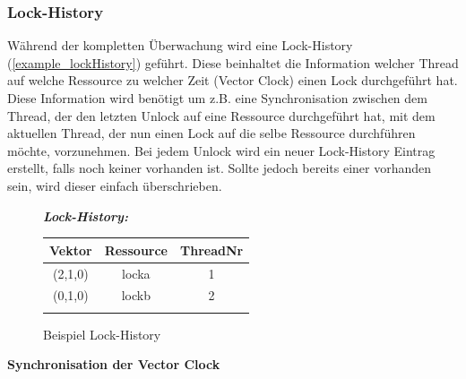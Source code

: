 \documentclass[10pt,a4paper]{article}
\begin{document}
\subsubsection{Lock-History}\label{lock_history}
\begin{flushleft}
Während der kompletten Überwachung wird eine Lock-History (\autoref{example_lockHistory}) geführt. Diese beinhaltet die Information welcher Thread auf welche Ressource zu welcher Zeit (Vector Clock) einen Lock durchgeführt hat. Diese Information wird benötigt um z.B. eine Synchronisation zwischen dem Thread, der den letzten Unlock auf eine Ressource durchgeführt hat, mit dem aktuellen Thread, der nun einen Lock auf die selbe Ressource durchführen möchte, vorzunehmen. Bei jedem Unlock wird ein neuer Lock-History Eintrag erstellt, falls noch keiner vorhanden ist. Sollte jedoch bereits einer vorhanden sein, wird dieser einfach überschrieben.\\
\end{flushleft}
\begin{figure}[H]
\begin{center}
\textbf{\textit{Lock-History:}}\\[0.5cm]
\begin{tabular}{ c c c }
  Vektor & Ressource & ThreadNr \\\hline
  (2,1,0) & locka & 1 \\
  (0,1,0) & lockb & 2 \\\hline\\
\end{tabular}
\caption{Beispiel Lock-History}\label{example_lockHistory}
\end{center}
\end{figure}
\textbf{Synchronisation der Vector Clock}
\end{document}

